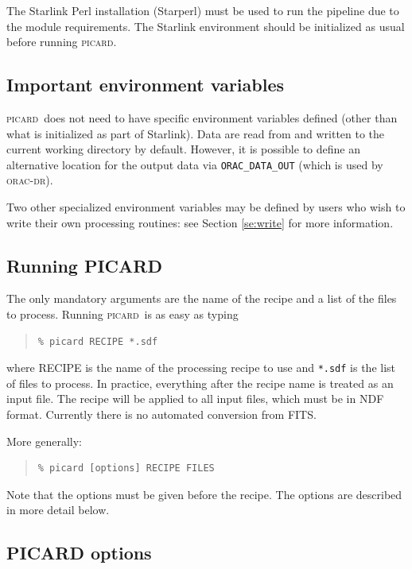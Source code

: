 \documentclass[twoside,11pt]{article}
\renewcommand{\_}{\texttt{\symbol{95}}}
\newenvironment{myquote}{\begin{quote}\begin{small}}{\end{small}\end{quote}}
\newcommand{\oracdr}{\textsc{orac-dr}}
\newcommand{\picard}{\textsc{picard}}
\newcommand{\task}[1]{\textsf{#1}}
\begin{document}
The Starlink Perl installation (Starperl) must be used to run the
pipeline due to the module requirements. The Starlink environment
should be initialized as usual before running \picard.

\subsection{Important environment variables}

\picard\ does not need to have specific environment variables defined
(other than what is initialized as part of Starlink). Data are read
from and written to the current working directory by default. However,
it is possible to define an alternative location for the output data
via \verb+ORAC_DATA_OUT+ (which is used by \oracdr).

Two other specialized environment variables may be defined by users
who wish to write their own processing routines: see Section
\ref{se:write} for more information.

\subsection{Running PICARD}

The only mandatory arguments are the name of the recipe and a list of
the files to process. Running \picard\ is as easy as typing
\begin{myquote}
\begin{verbatim}
% picard RECIPE *.sdf
\end{verbatim}
\end{myquote}
where \task{RECIPE} is the name of the processing recipe to use and
\verb+*.sdf+ is the list of files to process. In practice, everything
after the recipe name is treated as an input file. The recipe will be
applied to all input files, which must be in NDF format. Currently
there is no automated conversion from FITS.

More generally:
\begin{myquote}
\begin{verbatim}
% picard [options] RECIPE FILES
\end{verbatim}
\end{myquote}
Note that the options must be given before the recipe. The options
are described in more detail below.

\subsection{PICARD options}
\end{document}
